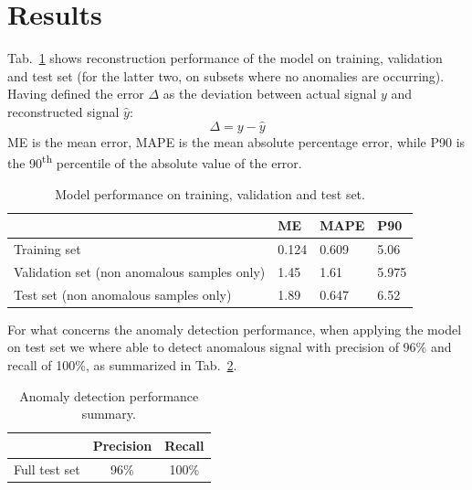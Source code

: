 \documentclass[runningheads]{llncs}
\begin{document}
\newpage
\section{Results}
Tab.~\ref{model_performance} shows reconstruction performance of the model on training, validation and test set (for the latter two, on subsets where no anomalies are occurring). 
Having defined the error $\Delta$ as the deviation between actual signal $y$ and reconstructed signal $\hat{y}$:
\begin{equation}
\Delta = y - \hat{y}
\end{equation}
ME is the mean error, MAPE is the mean absolute percentage error, while
P90 is the 90\textsuperscript{th} percentile of the absolute value of the error.

\begin{table}
\setlength{\tabcolsep}{1em}
\centering
\renewcommand{\arraystretch}{1.2}%
\caption{Model performance on training, validation and test set.}\label{model_performance}
\begin{tabular}{|l|l|l|l|}
\hline
  & ME & MAPE & P90\\
\hline
Training set & 0.124 & 0.609 & 5.06\\
Validation set (non anomalous samples only) &  1.45 &  1.61  &  5.975 \\
Test set (non anomalous samples only) &  1.89 &  0.647  &  6.52\\ 
\hline
\end{tabular}
\end{table}

For what concerns the anomaly detection performance, when applying the model on test set we where able to detect anomalous signal with precision of 96\% and recall of 100\%, as summarized in Tab.~\ref{ad_performance}.

\begin{table}
\setlength{\tabcolsep}{1em}
\centering
\renewcommand{\arraystretch}{1.2}%
\caption{Anomaly detection performance summary.}\label{ad_performance}
\begin{tabular}{| c | c | c |}
\hline
      &       Precision      &       Recall      \\
\hline
Full test set & 96\% & 100\%\\
\hline
\end{tabular}
\end{table}


\end{document}
